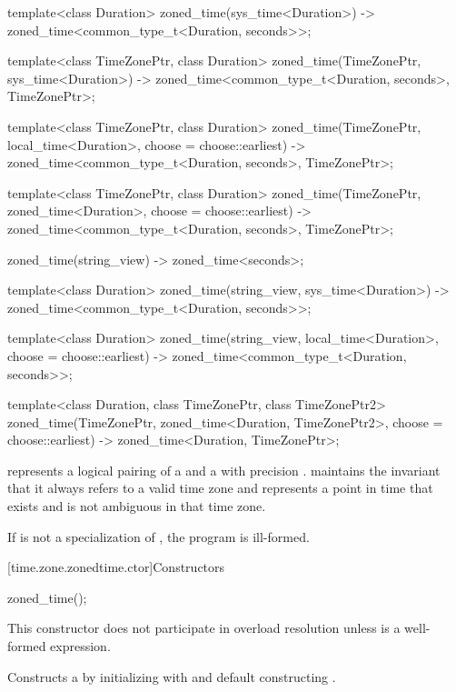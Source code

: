 \begin{codeblock}
{  template<class Duration>
    zoned_time(sys_time<Duration>)
      -> zoned_time<common_type_t<Duration, seconds>>;

  template<class TimeZonePtr, class Duration>
    zoned_time(TimeZonePtr, sys_time<Duration>)
      -> zoned_time<common_type_t<Duration, seconds>, TimeZonePtr>;

  template<class TimeZonePtr, class Duration>
    zoned_time(TimeZonePtr, local_time<Duration>, choose = choose::earliest)
      -> zoned_time<common_type_t<Duration, seconds>, TimeZonePtr>;

  template<class TimeZonePtr, class Duration>
    zoned_time(TimeZonePtr, zoned_time<Duration>, choose = choose::earliest)
      -> zoned_time<common_type_t<Duration, seconds>, TimeZonePtr>;

  zoned_time(string_view) -> zoned_time<seconds>;

  template<class Duration>
    zoned_time(string_view, sys_time<Duration>)
      -> zoned_time<common_type_t<Duration, seconds>>;

  template<class Duration>
    zoned_time(string_view, local_time<Duration>, choose = choose::earliest)
      -> zoned_time<common_type_t<Duration, seconds>>;

  template<class Duration, class TimeZonePtr, class TimeZonePtr2>
    zoned_time(TimeZonePtr, zoned_time<Duration, TimeZonePtr2>, choose = choose::earliest)
      -> zoned_time<Duration, TimeZonePtr>;
}
\end{codeblock}

\pnum
{} represents a logical pairing of
a  and a  with precision .
 maintains the invariant that
it always refers to a valid time zone and
represents a point in time that exists and is not ambiguous
in that time zone.

\pnum
If  is not a specialization of ,
the program is ill-formed.

[time.zone.zonedtime.ctor]{Constructors}

%
\begin{itemdecl}
zoned_time();
\end{itemdecl}

\begin{itemdescr}
\pnum
\remarks
This constructor does not participate in overload resolution unless
 is a well-formed expression.

\pnum
\effects
Constructs a  by
initializing  with  and
default constructing .
\end{itemdescr}

